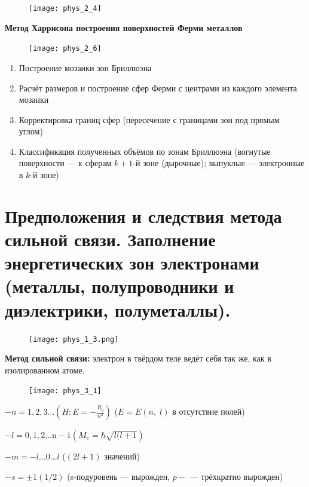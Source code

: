 \begin{figure}[h!]
    \centering
    \texttt{[image: phys\_2\_4]}
\end{figure}

\textbf{Метод Харрисона построения поверхностей Ферми металлов}

\begin{figure}[h!]
    \centering
    \texttt{[image: phys\_2\_6]}
\end{figure}


\begin{enumerate}
    \item Построение мозаики зон Бриллюэна
    \item Расчёт размеров и построение сфер Ферми с центрами из каждого элемента мозаики
    \item Корректировка границ сфер (пересечение с границами зон под прямым углом)
    \item Классификация полученных объёмов по зонам Бриллюэна (вогнутые поверхности --- к сферам $k+1$-й зоне (дырочные); выпуклые --- электронные в $k$-й зоне)
\end{enumerate}


\section{Предположения и следствия метода сильной связи. Заполнение энергетических зон электронами (металлы, полупроводники и диэлектрики, полуметаллы).}

\begin{figure}[h!]
    \centering
    \texttt{[image: phys\_1\_3.png]}
\end{figure}

\textbf{Метод сильной связи:} электрон в твёрдом теле ведёт себя так же, как в изолированном атоме.

\begin{figure}[h!]
    \centering
    \texttt{[image: phys\_3\_1]}
\end{figure}

$\displaystyle -n=1,2,3 \ldots\left(H: E=-\frac{R_y}{n^{2}}\right)$ ($E=E(n, \;l)$ в отсутствие полей)

$\displaystyle -l=0,1,2 \ldots \mathrm{n}-1\left(M_{e}=\hbar \sqrt{l(l+1}\right)$

$\displaystyle -m=-l \ldots 0 \ldots l$ ($(2 l+1)$ значений)

$\displaystyle -s= \pm 1(1 / 2)$ (s-подуровень --- вырожден, $p-$ --- трёхкратно вырожден)

